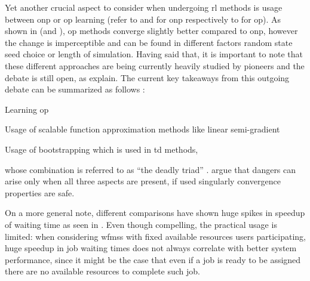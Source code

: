 Yet another crucial aspect to consider when undergoing \gls{rl} methods is usage between \gls{onp} or \gls{op} learning (refer to  and  for \gls{onp} respectively to  for \gls{op}). As shown in  (and ), \gls{op} methods converge slightly better compared to \gls{onp}, however the change is imperceptible and can be found in different factors \eg random state seed choice or length of simulation. Having said that, it is important to note that these different approaches are being currently heavily studied by pioneers and the debate is still open, as \citet[pp. 245--249]{Sutton2017} explain. The current key takeaways from this outgoing debate can be summarized as follows \citep{Sutton2017}:
\begin{enumerate*}
	\item Learning \gls{op}
	\item Usage of scalable function approximation methods like linear semi-gradient 
	\item Usage of bootstrapping which is used in \gls{td} methods,
\end{enumerate*}
whose combination is referred to as ``the deadly triad'' \citep[p. 249]{Sutton2017}. \citet[p. 249]{Sutton2017} argue that dangers can arise only when all three aspects are present, if used singularly convergence properties are safe.

On a more general note, different comparisons have shown huge spikes in speedup of waiting time \eg as seen in . Even though compelling, the practical usage is limited: when considering \glspl{wfms} with fixed available resources \ie users participating, huge speedup in job waiting times does not always correlate with better system performance, since it might be the case that even if a job is ready to be assigned there are no available resources to complete such job.


